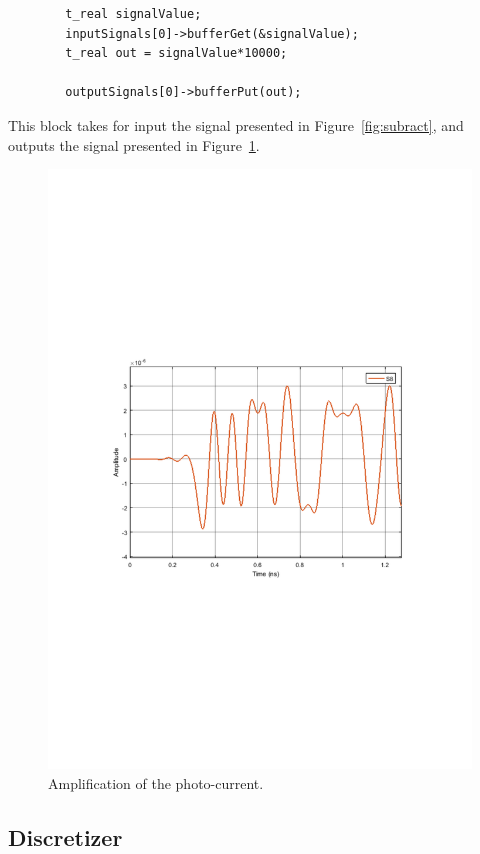 \documentclass{article}
\begin{document}
\begin{verbatim}
		t_real signalValue;
		inputSignals[0]->bufferGet(&signalValue);
		t_real out = signalValue*10000;

		outputSignals[0]->bufferPut(out);
\end{verbatim}

This block takes for input the signal presented in Figure~\ref{fig:subract}, and outputs the signal presented in Figure~\ref{fig:amplf}.

\begin{figure}[H]
\centering
\includegraphics[width=\linewidth, trim= 0mm 100mm 0mm 100mm, clip]{amplified.pdf}
\caption{Amplification of the photo-current.}
\label{fig:amplf}
\end{figure}

\subsection{Discretizer}
\end{document}
